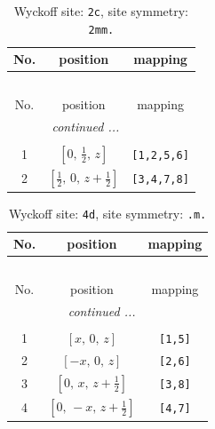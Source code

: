\documentclass[fleqn,8pt]{jsarticle}
\begin{document}
\renewcommand{\arraystretch}{1.2}
\begin{longtable}{ccc}
\caption{Wyckoff site: {\tt 2c}, site symmetry: {\tt 2mm.}}
 \\
 \hline \hline
No. & position & mapping \\ \hline \endfirsthead

\multicolumn{2}{l}{\tablename\ \thetable{}} \\
 \hline \hline
No. & position & mapping \\ \hline \endhead

 \hline \hline
\multicolumn{2}{r}{\footnotesize\it continued ...} \\ \endfoot

 \hline \hline
\multicolumn{2}{r}{} \\ \endlastfoot

1 & $\left[ 0,\, \frac{1}{2},\, z \right]$ & {\tt [1,2,5,6]} \\ \hline
2 & $\left[ \frac{1}{2},\, 0,\, z + \frac{1}{2} \right]$ & {\tt [3,4,7,8]} \\
\end{longtable}
\renewcommand{\arraystretch}{1.2}
\begin{longtable}{ccc}
\caption{Wyckoff site: {\tt 4d}, site symmetry: {\tt .m.}}
 \\
 \hline \hline
No. & position & mapping \\ \hline \endfirsthead

\multicolumn{2}{l}{\tablename\ \thetable{}} \\
 \hline \hline
No. & position & mapping \\ \hline \endhead

 \hline \hline
\multicolumn{2}{r}{\footnotesize\it continued ...} \\ \endfoot

 \hline \hline
\multicolumn{2}{r}{} \\ \endlastfoot

1 & $\left[ x,\, 0,\, z \right]$ & {\tt [1,5]} \\ \hline
2 & $\left[ - x,\, 0,\, z \right]$ & {\tt [2,6]} \\ \hline
3 & $\left[ 0,\, x,\, z + \frac{1}{2} \right]$ & {\tt [3,8]} \\ \hline
4 & $\left[ 0,\, - x,\, z + \frac{1}{2} \right]$ & {\tt [4,7]} \\
\end{longtable}
\renewcommand{\arraystretch}{1.2}
\end{document}

